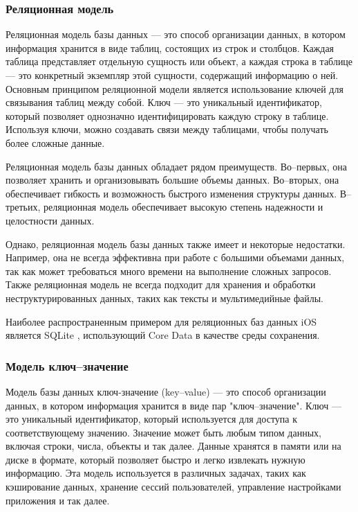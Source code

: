 \subsubsection{Реляционная модель}

Реляционная модель базы данных --- это способ организации данных, в котором информация хранится в виде таблиц, состоящих из строк и столбцов. Каждая таблица представляет отдельную сущность или объект, а каждая строка в таблице --- это конкретный экземпляр этой сущности, содержащий информацию о ней. Основным принципом реляционной модели является использование ключей для связывания таблиц между собой. Ключ --- это уникальный идентификатор, который позволяет однозначно идентифицировать каждую строку в таблице. Используя ключи, можно создавать связи между таблицами, чтобы получать более сложные данные.

Реляционная модель базы данных обладает рядом преимуществ. Во--первых, она позволяет хранить и организовывать большие объемы данных. Во--вторых, она обеспечивает гибкость и возможность быстрого изменения структуры данных. В--третьих, реляционная модель обеспечивает высокую степень надежности и целостности данных.

Однако, реляционная модель базы данных также имеет и некоторые недостатки. Например, она не всегда эффективна при работе с большими объемами данных, так как может требоваться много времени на выполнение сложных запросов. Также реляционная модель не всегда подходит для хранения и обработки неструктурированных данных, таких как тексты и мультимедийные файлы.

Наиболее распространенным примером для реляционных баз данных iOS является SQLite \cite{sqlite}, использующий Core Data \cite{coredata} в качестве среды сохранения. 

\subsubsection{Модель ключ--значение}

Модель базы данных ключ-значение (key--value) --- это способ организации данных, в котором информация хранится в виде пар "ключ--значение". Ключ --- это уникальный идентификатор, который используется для доступа к соответствующему значению. Значение может быть любым типом данных, включая строки, числа, объекты и так далее. Данные хранятся в памяти или на диске в формате, который позволяет быстро и легко извлекать нужную информацию. Эта модель используется в различных задачах, таких как кэширование данных, хранение сессий пользователей, управление настройками приложения и так далее.

